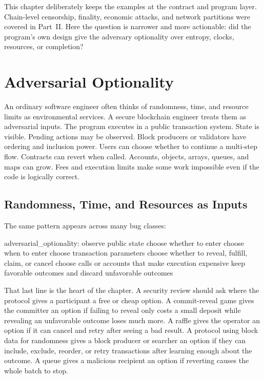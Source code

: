 This chapter deliberately keeps the examples at the contract and program layer. Chain-level censorship, finality, economic attacks, and network partitions were covered in Part~II. Here the question is narrower and more actionable: did the program's own design give the adversary optionality over entropy, clocks, resources, or completion?

\section{Adversarial Optionality}

An ordinary software engineer often thinks of randomness, time, and resource limits as environmental services. A secure blockchain engineer treats them as adversarial inputs. The program executes in a public transaction system. State is visible. Pending actions may be observed. Block producers or validators have ordering and inclusion power. Users can choose whether to continue a multi-step flow. Contracts can revert when called. Accounts, objects, arrays, queues, and maps can grow. Fees and execution limits make some work impossible even if the code is logically correct.

\subsection{Randomness, Time, and Resources as Inputs}

The same pattern appears across many bug classes:

\begin{codeblock}
adversarial_optionality:
    observe public state
    choose whether to enter
    choose when to enter
    choose transaction parameters
    choose whether to reveal, fulfill, claim, or cancel
    choose calls or accounts that make execution expensive
    keep favorable outcomes and discard unfavorable outcomes
\end{codeblock}

That last line is the heart of the chapter. A security review should ask where the protocol gives a participant a free or cheap option. A commit-reveal game gives the committer an option if failing to reveal only costs a small deposit while revealing an unfavorable outcome loses much more. A raffle gives the operator an option if it can cancel and retry after seeing a bad result. A protocol using block data for randomness gives a block producer or searcher an option if they can include, exclude, reorder, or retry transactions after learning enough about the outcome. A queue gives a malicious recipient an option if reverting causes the whole batch to stop.

